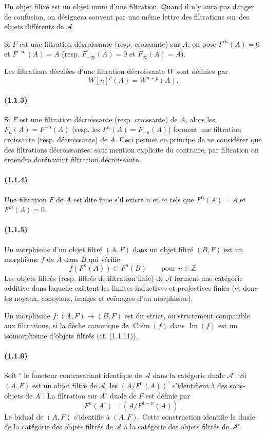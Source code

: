 \documentclass[10pt]{article}
\newcommand{\Z}{\mathbb Z}
\newcommand{\Imop}{\operatorname{Im}}
\newcommand{\fg}{\guillemotright}
\newcommand{\og}{\guillemotleft}
\newcommand{\calA}{\mathcal A}
\begin{document}
Un objet filtré est un objet muni d'une filtration. Quand il n'y aura pas danger de confusion, on désignera souvent par une même lettre des filtrations sur des objets différents de $\calA$.

Si $F$ est une filtration décroissante (resp. croissante) sur $A$, on pose $F^\infty(A)=0$ et $F^{-\infty}(A)=A$ (resp. $F_{-\infty}(A)=0$ et $F_{\infty}(A)=A$).

Les filtrations décalées d'une filtration décroissante $W$ sont définies par
\[
W[n]^p(A)=W^{n+p}(A).
\]

\paragraph{(1.1.3)} Si $F$ est une filtration décroissante (resp. croissante) de $A$, alors les $F_n(A)=F^{-n}(A)$ (resp. les $F^n(A)=F_{-n}(A)$) forment une filtration croissante (resp. décroissante) de $A$. Ceci permet en principe de ne considérer que des filtrations décroissantes; sauf mention explicite du contraire, par \og filtration\fg{} on entendra dorénavant \og filtration décroissante\fg{}.

\paragraph{(1.1.4)} Une filtration $F$ de $A$ est dite finie s'il existe $n$ et $m$ tels que $F^n(A)=A$ et $F^m(A)=0$.

\paragraph{(1.1.5)} Un morphisme d'un objet filtré $(A,F)$ dans un objet filtré $(B,F)$ est un morphisme $f$ de $A$ dans $B$ qui vérifie
\[
f(F^n(A))\subset F^n(B)\qquad\text{pour }n\in\Z.
\]
Les objets filtrés (resp. filtrés de filtration finie) de $\calA$ forment une catégorie additive dans laquelle existent les limites inductives et projectives finies (et donc les noyaux, conoyaux, images et coïmages d'un morphisme).

Un morphisme $f:(A,F)\to(B,F)$ est dit strict, ou strictement compatible aux filtrations, si la flèche canonique de $\operatorname{Coïm}(f)$ dans $\Imop(f)$ est un isomorphisme d'objets filtrés (cf. (1.1.11)).

\paragraph{(1.1.6)} Soit ${}^{\circ}$ le foncteur contravariant identique de $\calA$ dans la catégorie duale $\calA^{\circ}$. Si $(A,F)$ est un objet filtré de $\calA$, les $(A/F^n(A))^{\circ}$ s'identifient à des sous-objets de $A^{\circ}$. La filtration sur $A^{\circ}$ duale de $F$ est définie par
\[
F^n(A^{\circ})=(A/F^{1-n}(A))^{\circ}.
\]
Le bidual de $(A,F)$ s'identifie à $(A,F)$. Cette construction identifie la duale de la catégorie des objets filtrés de $\calA$ à la catégorie des objets filtrés de $\calA^{\circ}$.
\end{document}
